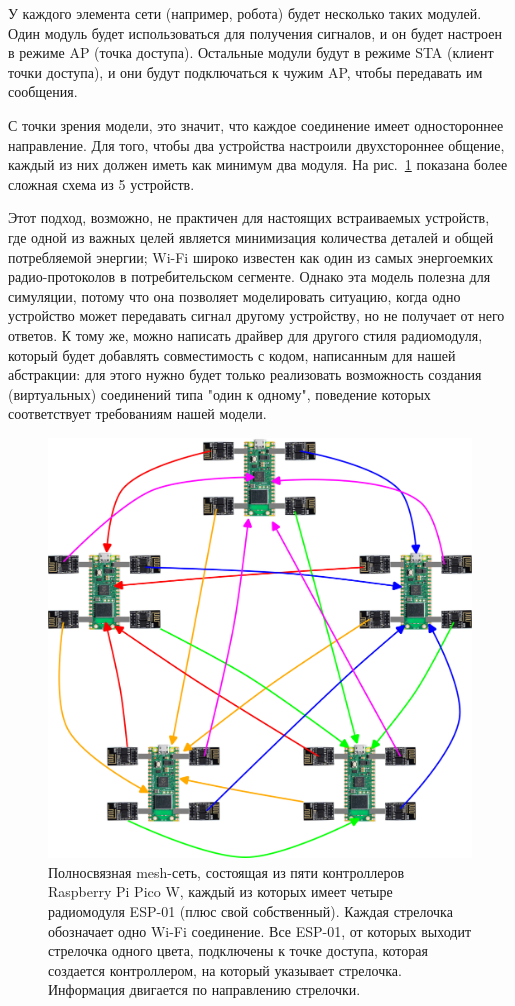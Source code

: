 \documentclass[%
]{report}
\begin{document}
У каждого элемента сети (например, робота)
будет несколько таких модулей.
Один модуль будет использоваться для получения сигналов,
и он будет настроен в режиме AP (точка доступа).
Остальные модули будут в режиме STA (клиент точки доступа),
и они будут подключаться к чужим AP,
чтобы передавать им сообщения.

С точки зрения модели, это значит,
что каждое соединение имеет одностороннее направление.
Для того, чтобы два устройства настроили двухстороннее общение,
каждый из них должен иметь как минимум два модуля.
На рис.~\ref{fig:connections} показана более сложная схема из 5 устройств.

Этот подход, возможно, не практичен для настоящих встраиваемых устройств,
где одной из важных целей является минимизация количества деталей
и общей потребляемой энергии;
Wi-Fi широко известен как один из самых энергоемких радио-протоколов в потребительском сегменте.
Однако эта модель полезна для симуляции,
потому что она позволяет моделировать ситуацию,
когда одно устройство может передавать сигнал другому устройству,
но не получает от него ответов.
К тому же,
можно написать драйвер для другого стиля радиомодуля,
который будет добавлять совместимость с кодом,
написанным для нашей абстракции:
для этого нужно будет только реализовать возможность создания (виртуальных)
соединений типа "один к одному",
поведение которых соответствует требованиям нашей модели.

\begin{figure}
  \centering
  \includegraphics[width=0.8\linewidth]{connections}
  \caption{Полносвязная mesh-сеть, состоящая из пяти контроллеров Raspberry Pi Pico W, каждый из которых имеет четыре радиомодуля ESP-01 (плюс свой собственный). Каждая стрелочка обозначает одно Wi-Fi соединение. Все ESP-01, от которых выходит стрелочка одного цвета, подключены к точке доступа, которая создается контроллером, на который указывает стрелочка. Информация двигается по направлению стрелочки.}
  \label{fig:connections}
\end{figure}
\end{document}
